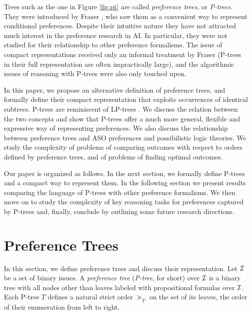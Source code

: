Trees such as the one in Figure \ref{fig:pt} are called \emph{preference 
trees}, or \emph{P-trees}. They were introduced by Fraser 
\cite{fraser1993,fraser1994}, who saw them as a convenient way to
represent conditional preferences. Despite their intuitive nature they
have not attracted much interest in the preference research in AI. In
particular, they were not studied for their relationship to other 
preference formalisms. The issue of compact representations received 
only an informal treatment by Fraser (P-trees in their full representation
are often impractically large), and the algorithmic issues of reasoning
with P-trees were also only touched upon. 


In this paper, we propose an alternative definition of preference trees, 
and formally define their compact representation that exploits occurrences 
of identical subtrees. P-trees are reminiscent of LP-trees 
\cite{booth:learningLP}. We discuss the relation between the two concepts 
and show that P-trees offer a much more general, flexible and expressive 
way of representing preferences. We also discuss the relationship between 
preference trees and ASO preferences and possibilistic logic theories. 
We study the complexity of problems of comparing outcomes with respect 
to orders defined by preference trees, and of problems of finding optimal 
outcomes. 

Our paper is organized as follows. In the next section, we formally 
define P-trees and a compact way to represent them. In the following 
section we present results comparing the language of P-trees with other 
preference formalisms. We then move on to study the complexity of key 
reasoning tasks for preferences captured by P-trees and, finally, 
conclude by outlining some future research directions.


\section{Preference Trees}

In this section, we define preference trees and discuss their
representation. Let $\mathcal{I}$ be a set of binary issues. A \emph{preference
tree} (\textit{P-tree}, for short) over $\mathcal{I}$ is
a binary tree with all nodes other than 
leaves labeled with propositional formulas over $\mathcal{I}$. Each P-tree 
$T$ defines a natural strict order $\succeq_T$ on the set of its leaves, 
the order of their enumeration from left to right. 

